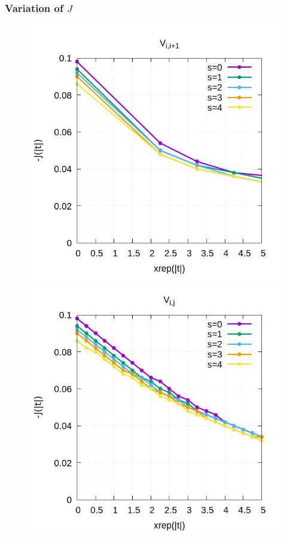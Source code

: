 \documentclass[12pt,twoside]{report}
\begin{document}
	\subsubsection{Variation of $J$}
	\begin{figure}[h!]
		\centering
		\hspace{-2cm}
		\begin{minipage}{0.4\textwidth}
			\includegraphics[scale=0.4]{J_vs_xrepv1.png}
		\end{minipage}
		\hspace{2cm}
		\begin{minipage}{0.4\textwidth}
			\includegraphics[scale=0.4]{J_vs_xrepvn.png}

\end{minipage}
\end{figure}
\end{document}
